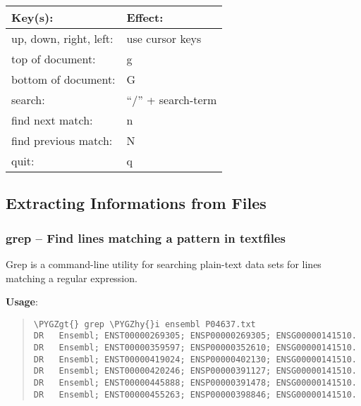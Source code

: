 \documentclass[a4paper,11pt,english]{sphinxmanual}
\def\PYGZgt{\char`\>}
\def\PYGZhy{\char`\-}
\begin{document}
\begin{tabulary}{\linewidth}{|L|L|}
\hline
\textbf{
Key(s):
} & \textbf{
Effect:
}\\\hline

up, down, right, left:
 & 
use cursor keys
\\\hline

top of document:
 & 
g
\\\hline

bottom of document:
 & 
G
\\\hline

search:
 & 
“/” + search-term
\\\hline

find next match:
 & 
n
\\\hline

find previous match:
 & 
N
\\\hline

quit:
 & 
q
\\\hline
\end{tabulary}



\subsection{Extracting Informations from Files}
\label{introduction:extracting-informations-from-files}

\subsubsection{grep – Find lines matching a pattern in textfiles}
\label{introduction:grep-find-lines-matching-a-pattern-in-textfiles}
Grep is a command-line utility for searching plain-text data sets for lines matching a regular expression.

\textbf{Usage}:  
\begin{quote}

\begin{Verbatim}[frame=single, rulecolor=\color{lightgray}, fontfamily=courier, commandchars=\\\{\}]
\PYGZgt{} grep \PYGZhy{}i ensembl P04637.txt
DR   Ensembl; ENST00000269305; ENSP00000269305; ENSG00000141510.
DR   Ensembl; ENST00000359597; ENSP00000352610; ENSG00000141510.
DR   Ensembl; ENST00000419024; ENSP00000402130; ENSG00000141510.
DR   Ensembl; ENST00000420246; ENSP00000391127; ENSG00000141510.
DR   Ensembl; ENST00000445888; ENSP00000391478; ENSG00000141510.
DR   Ensembl; ENST00000455263; ENSP00000398846; ENSG00000141510.
\end{Verbatim}
\end{quote}
\end{document}
